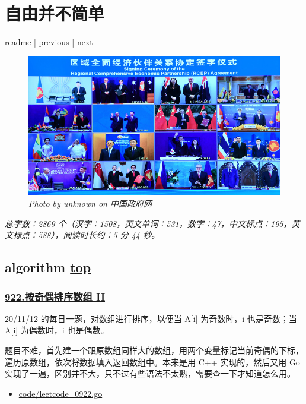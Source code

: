\chapter{自由并不简单}\label{chap:w3}

\noindent \href{https://github.com/taseikyo/arts}{readme} | \hyperref[chap:w2]{previous} | \hyperref[chap:w4]{next}

\begin{figure}[htbp]
  \centering
    \includegraphics[width=\textwidth]{../images/2020/11/2020-11-15-RCEP.jpg}
  \caption{\textit{Photo by unknown on 中国政府网}}
\end{figure}

\textit{总字数：2869 个（汉字：1508，英文单词：531，数字：47，中文标点：195，英文标点：588），阅读时长约：5 分 44 秒。}

\section{algorithm \hyperref[chap:w3]{top}}\label{w3:algorithm}

\subsection{\href{https://leetcode-cn.com/problems/sort-array-by-parity-ii/}{922.按奇偶排序数组 II}}

20/11/12 的每日一题，对数组进行排序，以便当 A[i] 为奇数时，i 也是奇数；当 A[i] 为偶数时，i 也是偶数。

题目不难，首先建一个跟原数组同样大的数组，用两个变量标记当前奇偶的下标，遍历原数组，依次将数据填入返回数组中。本来是用 C++ 实现的，然后又用 Go 实现了一遍，区别并不大，只不过有些语法不太熟，需要查一下才知道怎么用。

\begin{itemize}
  \item \href{https://github.com/taseikyo/arts/blob/master/code/leetcode_0922.go}{code/leetcode\_0922.go}
\end{itemize}

